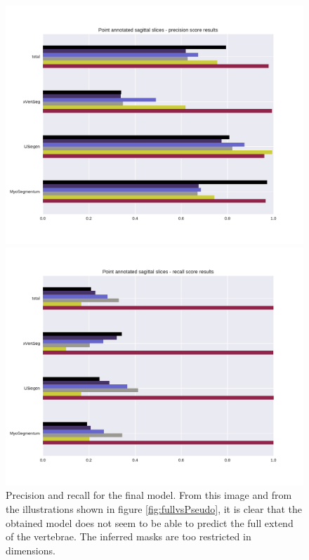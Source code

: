 \begin{figure}
    \centering
    \begin{minipage}{.99\textwidth}
        \includegraphics[width=.99\textwidth]{images/pointAnnotated_perClass_perSource_point_precision.pdf}
    \end{minipage} 
    \vspace{2 mm}
    \begin{minipage}{.99\textwidth}
        \includegraphics[width=.99\textwidth]{images/pointAnnotated_perClass_perSource_point_recall.pdf}
    \end{minipage} 
    \caption{Precision and recall for the final model. From this image and from the illustrations shown in figure \ref{fig:fullvsPseudo}, 
    it is clear that the obtained model does not seem to be able to predict the full extend of the vertebrae. The inferred masks are too restricted in dimensions.
    \protect
    }
\end{figure}